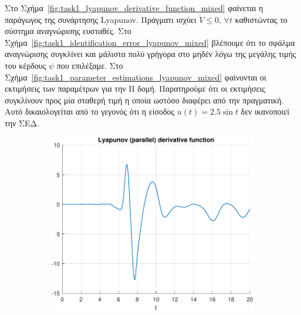 \documentclass[a4paper,12pt]{article}
\begin{document}
Στο Σχήμα~\ref{fig:task1_lyapunov_derivative_function_mixed} φαίνεται η παράγωγος της συνάρτησης 
Lyapunov. Πράγματι ισχύει 
$\dot{V} \leq 0, \, \forall t$ καθιστώντας το σύστημα αναγνώρισης ευσταθές.
Στο Σχήμα~\ref{fig:task1_identification_error_lyapunov_mixed} βλέπουμε ότι το σφάλμα αναγνώρισης
συγκλίνει και μάλιστα πολύ γρήγορα στο μηδέν λόγω της μεγάλης τιμής του κέρδους $\psi$ που επιλέξαμε.
Στο Σχήμα~\ref{fig:task1_parameter_estimations_lyapunov_mixed} φαίνονται οι εκτιμήσεις των παραμέτρων
για την Π δομή. Παρατηρούμε ότι οι εκτιμήσεις συγκλίνουν προς μία σταθερή τιμή η οποία ωστόσο διαφέρει
από την πραγματική. Αυτό δικαιολογείται από το γεγονός ότι η είσοδος $u(t) = 2.5 \sin t$ δεν ικανοποιεί την
ΣΕΔ. 

\begin{figure}[h!]
    \centering
    \begin{subfigure}{0.45\textwidth}
        \centering
        \includegraphics[width=\linewidth]{plot/task1_lyapunov_derivative_function_parallel.pdf}
        \caption{}
        \label{fig:task1_lyapunov_derivative_function_parallel}
    \end{subfigure}
    \hfill
    \begin{subfigure}{0.45\textwidth}
        \centering

\end{subfigure}
\end{figure}
\end{document}
